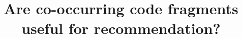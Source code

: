 \documentclass[conference]{IEEEtran}
\begin{document}
\title{Are co-occurring code fragments useful for recommendation?\\
}


\maketitle
\end{document}
